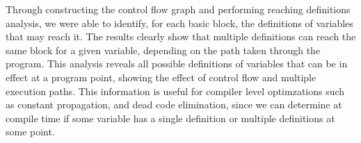 Through constructing the control flow graph and performing reaching definitions analysis, we were able to identify, for each basic block, the definitions of variables that may reach it. The results clearly show that multiple definitions can reach the same block for a given variable, depending on the path taken through the program. This analysis reveals all possible definitions of variables that can be in effect at a program point, showing the effect of control flow and multiple execution paths. This information is useful for compiler level optimzations such as constant propagation, and dead code elimination, since we can determine at compile time if some variable has a single definition or multiple definitions at some point.

\nocite{*}
